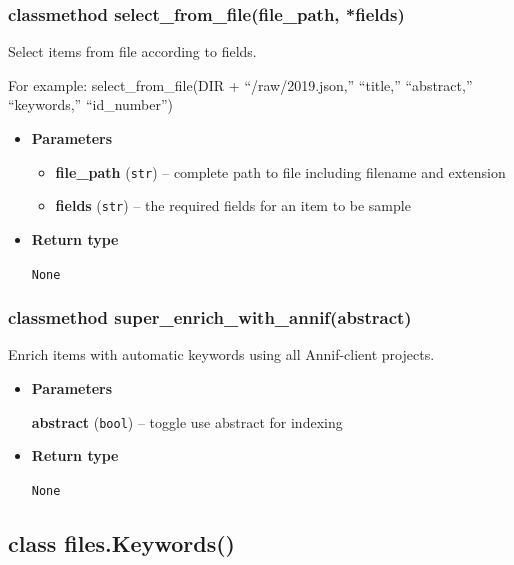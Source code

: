 \hypertarget{classmethod-select_from_filefile_path-fields}{%
\subsubsection{classmethod select\_from\_file(file\_path,
*fields)}\label{classmethod-select_from_filefile_path-fields}}

Select items from file according to fields.

For example: select\_from\_file(DIR + ``/raw/2019.json,'' ``title,''
``abstract,'' ``keywords,'' ``id\_number'')

\begin{itemize}
\item
  \textbf{Parameters}

  \begin{itemize}
  \item
    \textbf{file\_path} (\texttt{str}) -- complete path to file
    including filename and extension
  \item
    \textbf{fields} (\texttt{str}) -- the required fields for an item to
    be sample
  \end{itemize}
\item
  \textbf{Return type}

  \texttt{None}
\end{itemize}

\hypertarget{classmethod-super_enrich_with_annifabstract}{%
\subsubsection{classmethod
super\_enrich\_with\_annif(abstract)}\label{classmethod-super_enrich_with_annifabstract}}

Enrich items with automatic keywords using all Annif-client projects.

\begin{itemize}
\item
  \textbf{Parameters}

  \textbf{abstract} (\texttt{bool}) -- toggle use abstract for indexing
\item
  \textbf{Return type}

  \texttt{None}
\end{itemize}

\hypertarget{class-files.keywords}{%
\subsection{class files.Keywords()}\label{class-files.keywords}}

